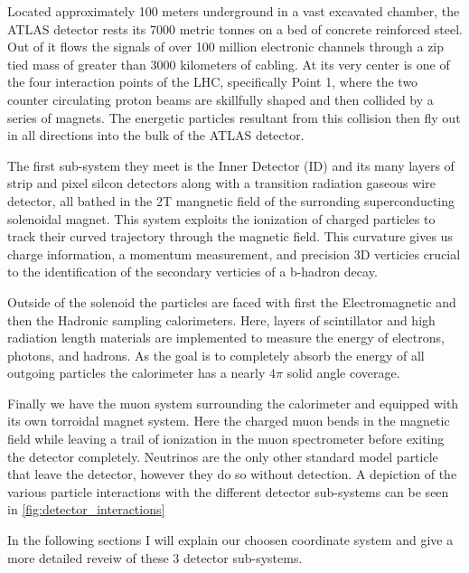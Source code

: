 Located approximately 100 meters underground in a vast excavated chamber, the
ATLAS detector rests its 7000 metric tonnes on a bed of concrete reinforced
steel.  Out of it flows the signals of over 100 million electronic channels
through a zip tied mass of greater than 3000 kilometers of cabling.  At its very
center is one of the four interaction points of the LHC, specifically Point 1,
where the two counter circulating proton beams are skillfully shaped and then
collided by a series of magnets.  The energetic particles resultant from this
collision then fly out in all directions into the bulk of the ATLAS detector.

The first sub-system they meet is the Inner Detector (ID) and its many layers of
strip and pixel silcon detectors along with a transition radiation gaseous wire
detector, all bathed in the 2T mangnetic field of the surronding superconducting
solenoidal magnet.  This system exploits the ionization of charged particles to
track their curved trajectory through the magnetic field.  This curvature gives
us charge information, a momentum measurement, and precision 3D verticies
crucial to the identification of the secondary verticies of a b-hadron decay. 

Outside of the solenoid the particles are faced with first the Electromagnetic
and then the Hadronic sampling calorimeters. Here, layers of scintillator and
high radiation length materials are implemented to measure the energy of
electrons, photons, and hadrons. As the goal is to completely absorb the energy
of all outgoing particles the calorimeter has a nearly $4\pi$ solid angle
coverage.

Finally we have the muon system surrounding the calorimeter and equipped with
its own torroidal magnet system.  Here the charged muon bends in the magnetic
field while leaving a trail of ionization in the muon spectrometer before
exiting the detector completely.  Neutrinos are the only other standard model
particle that leave the detector, however they do so without detection.  A
depiction of the various particle interactions with the different detector
sub-systems can be seen in \cref{fig:detector_interactions}

In the following sections I will explain our choosen coordinate system and give 
a more detailed reveiw of these 3 detector sub-systems.


